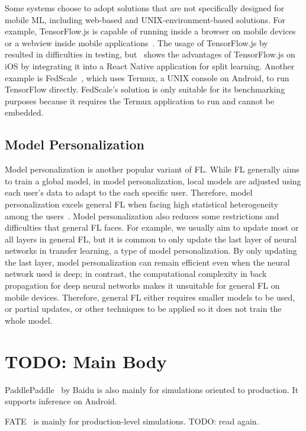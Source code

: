 \documentclass[conference]{IEEEtran}
\begin{document}
Some systems choose to adopt solutions that are not specifically designed for
mobile ML,
including web-based and UNIX-environment-based solutions.
For example,
TensorFlow.js is capable of running inside a browser on mobile devices or
a webview inside mobile applications~\cite{smilkov2019tensorflow}.
The usage of TensorFlow.js by~\cite{sriraman2022device} resulted in
difficulties in testing,
but~\cite{palanisamy2021spliteasy} shows the advantages of TensorFlow.js on iOS
by integrating it into a React Native application for split learning.
Another example is FedScale~\cite{lai2022fedscale},
which uses Termux, a UNIX console on Android,
to run TensorFlow directly.
FedScale's solution is only suitable for its benchmarking purposes because
it requires the Termux application to run and
cannot be embedded.

\subsection{Model Personalization}

Model personalization is another popular variant of FL.
While FL generally aims to train a global model,
in model personalization,
local models are adjusted using each user's data to
adapt to the each specific user.
Therefore, model personalization excels general FL when
facing high statistical heterogeneity among the users~\cite{kulkarni2020survey}.
Model personalization also reduces some restrictions and difficulties that
general FL faces.
For example,
we usually aim to update most or all layers in general FL,
but it is common to only update the last layer of neural networks in
transfer learning,
a type of model personalization.
By only updating the last layer,
model personalization can remain efficient even when
the neural network used is deep;
in contrast, the computational complexity in back propagation for
deep neural networks makes it unsuitable for general FL on mobile devices.
Therefore, general FL either requires smaller models to be used,
or partial updates,
or other techniques to be applied so it does not train the whole model.

\section{TODO: Main Body}

PaddlePaddle~\cite{ma2019paddlepaddle} by Baidu is
also mainly for simulations oriented to production.
It supports inference on Android.

FATE~\cite{liu2021fate} is mainly for production-level simulations.
TODO: read again.
\end{document}
